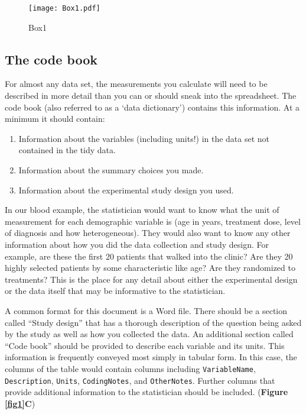 \documentclass[12pt]{article}
\providecommand{\tightlist}{%
  \setlength{\itemsep}{0pt}\setlength{\parskip}{0pt}}
\begin{document}
\begin{figure}[htbp]
\centering
\texttt{[image: Box1.pdf]}
\caption{Box1 \label{box1}}
\end{figure}

\subsection{The code book}\label{the-code-book}

For almost any data set, the measurements you calculate will need to be
described in more detail than you can or should sneak into the
spreadsheet. The code book (also referred to as a `data dictionary')
contains this information. At a minimum it should contain:

\begin{enumerate}
\def\labelenumi{\arabic{enumi}.}
\tightlist
\item
  Information about the variables (including units!) in the data set not
  contained in the tidy data.
\item
  Information about the summary choices you made.
\item
  Information about the experimental study design you used.
\end{enumerate}

In our blood example, the statistician would want to know what the unit
of measurement for each demographic variable is (age in years, treatment
dose, level of diagnosis and how heterogeneous). They would also want to
know any other information about how you did the data collection and
study design. For example, are these the first 20 patients that walked
into the clinic? Are they 20 highly selected patients by some
characteristic like age? Are they randomized to treatments? This is the
place for any detail about either the experimental design or the data
itself that may be informative to the statistician.

A common format for this document is a Word file. There should be a
section called ``Study design'' that has a thorough description of the
question being asked by the study as well as how you collected the data.
An additional section called ``Code book'' should be provided to
describe each variable and its units. This information is frequently
conveyed most simply in tabular form. In this case, the columns of the
table would contain columns including \texttt{VariableName},
\texttt{Description}, \texttt{Units}, \texttt{CodingNotes}, and
\texttt{OtherNotes}. Further columns that provide additional information
to the statistician should be included. (\textbf{Figure \ref{fig1}C})
\end{document}
